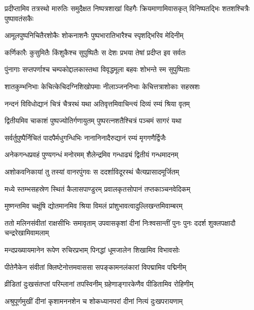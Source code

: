 \threelineshloka
{प्रदीप्तामिव तत्रस्थो मारुतिः समुदैक्षत}
{निष्पत्रशाखां विहगैः क्रियमाणामिवासकृत्}
{विनिष्पतद्भिः शतशश्चित्रैः पुष्पावतंसकैः} %

\twolineshloka
{आमूलपुष्पनिचितैरशोकैः शोकनाशनैः}
{पुष्पभारातिभारैश्च स्पृशद्भिरिव मेदिनीम्} %

\twolineshloka
{कर्णिकारैः कुसुमितैः किंशुकैश्च सुपुष्पितैः}
{स देशः प्रभया तेषां प्रदीप्त इव सर्वतः} %

\twolineshloka
{पुंनागाः सप्तपर्णाश्च चम्पकोद्दालकास्तथा}
{विवृद्धमूला बहवः शोभन्ते स्म सुपुष्पिताः} %

\twolineshloka
{शातकुम्भनिभाः केचित्केचिदग्निशिखोपमाः}
{नीलाञ्जननिभाः केचित्तत्राशोकाः सहस्रशः} %

\twolineshloka
{नन्दनं विविधोद्यानं चित्रं चैत्ररथं यथा}
{अतिवृत्तमिवाचिन्त्यं दिव्यं रम्यं श्रिया वृतम्} %

\twolineshloka
{द्वितीयमिव चाकाशं पुष्पज्योतिर्गणायुतम्}
{पुष्परत्नशतैश्चित्रं पञ्चमं सागरं यथा} %

\twolineshloka
{सर्वर्तुपुष्पैर्निचितं पादपैर्मधुगन्धिभिः}
{नानानिनादैरुद्यानं रम्यं मृगगणैर्द्विजैः} %

\twolineshloka
{अनेकगन्धप्रवहं पुण्यगन्धं मनोरमम्}
{शैलेन्द्रमिव गन्धाढ्यं द्वितीयं गन्धमादनम्} %

\twolineshloka
{अशोकवनिकायां तु तस्यां वानरपुंगवः}
{स ददर्शाविदूरस्थं चैत्यप्रासादमूर्जितम्} %

\twolineshloka
{मध्ये स्तम्भसहस्रेण स्थितं कैलासपाण्डुरम्}
{प्रवालकृतसोपानं तप्तकाञ्चनवेदिकम्} %

\twolineshloka
{मुष्णन्तमिव चक्षूंषि द्योतमानमिव श्रिया}
{विमलं प्रांशुभावत्वादुल्लिखन्तमिवाम्बरम्} %

\threelineshloka
{ततो मलिनसंवीतां राक्षसीभिः समावृताम्}
{उपवासकृशां दीनां निःश्वसान्तीं पुनः पुनः}
{ददर्श शुक्लपक्षादौ चन्द्ररेखामिवामलाम्} %

\twolineshloka
{मन्दप्रख्यायमानेन रूपेण रुचिरप्रभाम्}
{पिनद्धां धूमजालेन शिखामिव विभावसोः} %

\twolineshloka
{पीतेनैकेन संवीतां क्लिष्टेनोत्तमवाससा}
{सपङ्कामनलंकारां विपद्मामिव पद्मिनीम्} %

\twolineshloka
{व्रीडितां दुःखसंतप्तां परिम्लानां तपस्विनीम्}
{ग्रहेणाङ्गारकेणैव पीडितामिव रोहिणीम्} %

\twolineshloka
{अश्रुपूर्णमुखीं दीनां कृशामननशेन च}
{शोकध्यानपरां दीनां नित्यं दुःखपरायणाम्} %

